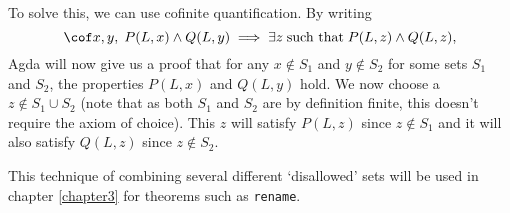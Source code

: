 To solve this, we can use cofinite quantification. By writing
\begin{equation*}
  \cof x, y, \; P(L, x) \wedge Q(L, y)
  \implies \exists z \; \text{such that} \; P(L, z) \wedge Q(L, z),
\end{equation*}
Agda will now give us a proof that for any $x \notin S_1$ and $y \notin S_2$ for some sets $S_1$ and
$S_2$, the properties $P(L, x)$ and $Q(L, y)$ hold. We now choose a $z \notin S_1 \cup
S_2$ (note that as both $S_1$ and $S_2$ are by definition finite, this doesn't require the
axiom of choice). This $z$ will satisfy $P(L, z)$ since $z \notin S_1$ and it will also satisfy
$Q(L, z)$ since $z \notin S_2$.

This technique of combining several different `disallowed' sets will be used in chapter
\ref{chapter3} for theorems such as \texttt{rename}.